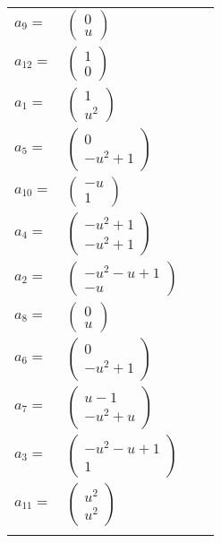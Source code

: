 \documentclass[1p]{elsarticle_modified}
\theoremstyle{definition}
\begin{document}
\begin{tabular}{m{7pt} m{180pt} m{7pt} m{180pt} }
\flushright $a_{9}=$&$\begin{pmatrix}0\\u\end{pmatrix}$ \\
\flushright $a_{12}=$&$\begin{pmatrix}1\\0\end{pmatrix}$ \\
\flushright $a_{1}=$&$\begin{pmatrix}1\\u^2\end{pmatrix}$ \\
\flushright $a_{5}=$&$\begin{pmatrix}0\\- u^2+1\end{pmatrix}$ \\
\flushright $a_{10}=$&$\begin{pmatrix}- u\\1\end{pmatrix}$ \\
\flushright $a_{4}=$&$\begin{pmatrix}- u^2+1\\- u^2+1\end{pmatrix}$ \\
\flushright $a_{2}=$&$\begin{pmatrix}- u^2- u+1\\- u\end{pmatrix}$ \\
\flushright $a_{8}=$&$\begin{pmatrix}0\\u\end{pmatrix}$ \\
\flushright $a_{6}=$&$\begin{pmatrix}0\\- u^2+1\end{pmatrix}$ \\
\flushright $a_{7}=$&$\begin{pmatrix}u-1\\- u^2+u\end{pmatrix}$ \\
\flushright $a_{3}=$&$\begin{pmatrix}- u^2- u+1\\1\end{pmatrix}$ \\
\flushright $a_{11}=$&$\begin{pmatrix}u^2\\u^2\end{pmatrix}$\\&\end{tabular}
\end{document}
